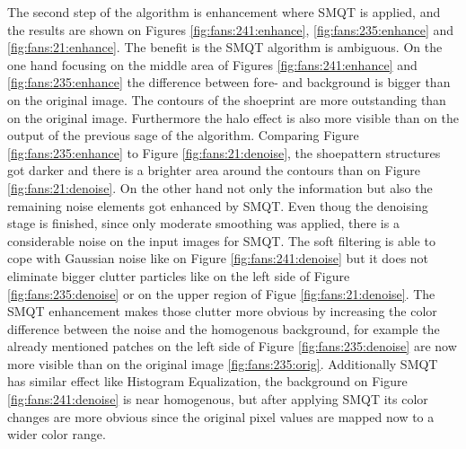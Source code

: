 \documentclass[draft,final]{vutinfth} %
\begin{document}
\par
The second step of the algorithm is enhancement where SMQT is applied, and the results are shown on Figures \ref{fig:fans:241:enhance}, \ref{fig:fans:235:enhance} and \ref{fig:fans:21:enhance}.
The benefit is the SMQT algorithm is ambiguous.
On the one hand focusing on the middle area of Figures  \ref{fig:fans:241:enhance} and \ref{fig:fans:235:enhance} the difference between fore- and background is bigger than on the original image.
The contours of the shoeprint are more outstanding than on the original image.
Furthermore the halo effect is also more visible than on the output of the previous sage of the algorithm.
Comparing Figure \ref{fig:fans:235:enhance} to Figure \ref{fig:fans:21:denoise}, the shoepattern structures got darker and there is a brighter area around the contours than on Figure \ref{fig:fans:21:denoise}.
On the other hand not only the information but also the remaining noise elements got enhanced by SMQT.
Even thoug the denoising stage is finished, since only moderate smoothing was applied, there is a considerable noise on the input images for SMQT.
The soft filtering is able to cope with Gaussian noise like on Figure \ref{fig:fans:241:denoise} but it does not eliminate bigger clutter particles like on the left side of Figure \ref{fig:fans:235:denoise} or on the upper region of Figue \ref{fig:fans:21:denoise}.
The SMQT enhancement makes those clutter more obvious by increasing the color difference between the noise and the homogenous background, for example the already mentioned patches on the left side of Figure \ref{fig:fans:235:denoise} are now more visible than on the original image \ref{fig:fans:235:orig}.
Additionally SMQT has similar effect like Histogram Equalization, the background on Figure \ref{fig:fans:241:denoise} is near homogenous, but after applying SMQT its color changes are more obvious since the original pixel values are mapped now to a wider color range.
\end{document}
